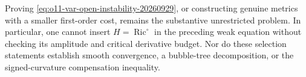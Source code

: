 \documentclass[11pt]{article}
\begin{document}
Proving \eqref{eq:o11-var-open-instability-20260929}, or constructing
genuine metrics with a smaller first-order cost, remains the substantive
unrestricted problem. In particular, one cannot insert
$H=\operatorname{Ric}^{\circ}$ in the preceding weak equation without
checking its amplitude and critical derivative budget. Nor do these
selection statements establish smooth convergence, a bubble-tree
decomposition, or the signed-curvature compensation inequality.
\end{document}
